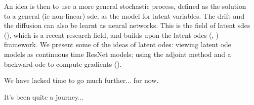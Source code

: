 An idea is then to use a more general stochastic process, defined as the solution to a general (ie non-linear) \gls{sde}, as the model for 
latent variables. The drift and the diffusion can also be learnt as neural networks. This is the field of \glspl{latent sde} (\cite{peluchetti_infinitely_2020}), 
which is a recent research field, and builds upon the \glspl{latent ode} (\cite{chen_neural_2019}, \cite{rubanova_latent_2019}) framework. 
We present some of the ideas of \glspl{latent ode}: viewing \gls{latent ode} models as continuous time ResNet models; using the adjoint method and 
a backward \gls{ode} to compute gradients (\cite{li_scalable_2020}). 

We have lacked time to go much further... for now. 

It's been quite a journey...
